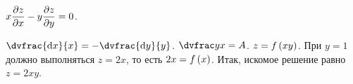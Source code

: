 \documentclass[a5paper,10pt]{article}
\begin{document}
    $x \dfrac{\partial z}{\partial x} - y \dfrac{\partial z}{\partial y} = 0$.
    
    $\dvfrac{\di x} {x} = -\dvfrac{\di y} {y}$.
    $\dvfrac yx = A$. $z = f\left(\hspace{0.01em}xy\hspace{0.01em}\right)$.
    При $y = 1$ должно выполняться $z = 2x$, то есть $2x = f\left(\hspace{0.01em}x\hspace{0.01em}\right)$.
    Итак, искомое решение равно $z = 2xy$.
\end{document}
